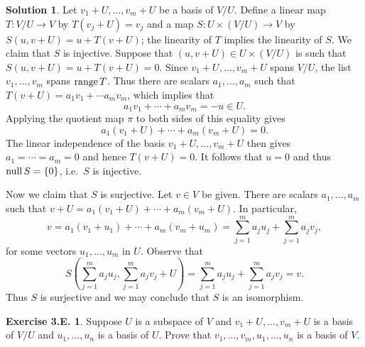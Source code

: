 \documentclass[12pt]{article}
\theoremstyle{definition}
\theoremstyle{exercise}
\newtheorem{exercise}{Exercise 3.E.}
\theoremstyle{solution}
\newtheorem*{solution}{Solution}
\newcommand{\Null}{\text{null\,}}
\newcommand{\Range}{\text{range\,}}
\begin{document}
\begin{solution}
    Let \( v_1 + U, \ldots, v_m + U \) be a basis of \( V/U \). Define a linear map \( T : V/U \to V \) by \( T(v_j + U) = v_j \) and a map \( S : U \times (V/U) \to V \) by \( S(u, v + U) = u + T(v + U) \); the linearity of \( T \) implies the linearity of \( S \). We claim that \( S \) is injective. Suppose that \( (u, v + U) \in U \times (V/U) \) is such that \( S(u, v + U) = u + T(v + U) = 0 \). Since \( v_1 + U, \ldots, v_m + U \) spans \( V/U \), the list \( v_1, \ldots, v_m \) spans \( \Range T \). Thus there are scalars \( a_1, \ldots, a_m \) such that \( T(v + U) = a_1 v_1 + \cdots a_m v_m \), which implies that
    \[
        a_1 v_1 + \cdots + a_m v_m = -u \in U.
    \]
    Applying the quotient map \( \pi \) to both sides of this equality gives
    \[
        a_1 (v_1 + U) + \cdots + a_m (v_m + U) = 0.
    \]
    The linear independence of the basis \( v_1 + U, \ldots, v_m + U \) then gives \( a_1 = \cdots = a_m = 0 \) and hence \( T(v + U) = 0 \). It follows that \( u = 0 \) and thus \( \Null S = \{ 0 \} \), i.e.\ \( S \) is injective.

    Now we claim that \( S \) is surjective. Let \( v \in V \) be given. There are scalars \( a_1, \ldots, a_m \) such that \( v + U = a_1 (v_1 + U) + \cdots + a_m (v_m + U) \). In particular,
    \[
        v = a_1 (v_1 + u_1) + \cdots + a_m (v_m + u_m) = \sum_{j=1}^m a_j u_j + \sum_{j=1}^m a_j v_j, 
    \]
    for some vectors \( u_1, \ldots, u_m \) in \( U \). Observe that
    \[
        S \left( \sum_{j=1}^m a_j u_j, \sum_{j=1}^m a_j v_j + U \right) = \sum_{j=1}^m a_j u_j + \sum_{j=1}^m a_j v_j = v.
    \]
    Thus \( S \) is surjective and we may conclude that \( S \) is an isomorphism.
\end{solution}

\begin{exercise}
\label{ex:13}
    Suppose \( U \) is a subspace of \( V \) and \( v_1 + U, \ldots, v_m + U \) is a basis of \( V/U \) and \( u_1, \ldots, u_n \) is a basis of \( U \). Prove that \( v_1, \ldots, v_m, u_1, \ldots, u_n \) is a basis of \( V \).
\end{exercise}
\end{document}
